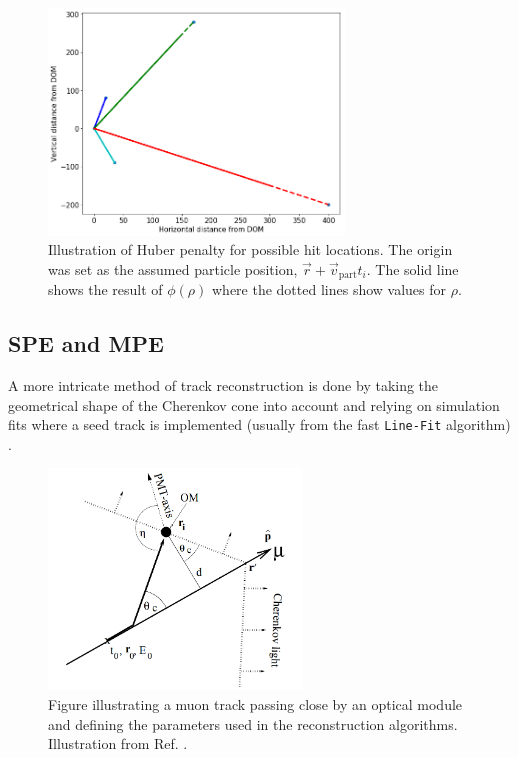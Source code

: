 \begin{figure}
\centering
\includegraphics[width=0.7\textwidth]{chapter7/img/exampleHuber.png}
\caption{Illustration of Huber penalty for possible hit locations. The origin was set as the assumed particle position, $\vec{r}+\vec{v}_\textrm{part}t_i$. The solid line shows the result of $\phi(\rho)$ where the dotted lines show values for $\rho$.}
\label{fig:huberpenalty}
\end{figure}

\subsection{SPE and MPE}
\label{subsec:spempe}
A more intricate method of track reconstruction is done by taking the geometrical shape of the Cherenkov cone into account and relying on simulation fits where a seed track is implemented (usually from the fast \texttt{Line-Fit} algorithm) \cite{Ahrens:2003fg}.


\begin{figure}
\centering
\includegraphics[width=0.6\textwidth]{chapter7/img/reconstruction.png}
\caption{Figure illustrating a muon track passing close by an optical module and defining the parameters used in the reconstruction algorithms. Illustration from Ref. \cite{Ahrens:2003fg}.}
\label{fig:reconstruction}
\end{figure}

